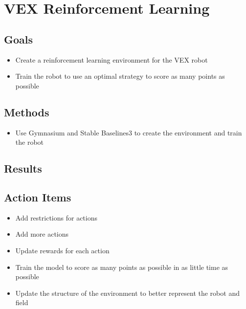 \section{VEX Reinforcement Learning}

\subsection{Goals}
\begin{itemize}
    \item Create a reinforcement learning environment for the VEX robot
    \item Train the robot to use an optimal strategy to score as many points as possible
\end{itemize}

\subsection{Methods}
\begin{itemize}
    \item Use Gymnasium and Stable Baselines3 to create the environment and train the robot
\end{itemize}

\subsection{Results}

\subsection{Action Items}
\begin{itemize}
    \item Add restrictions for actions
    \item Add more actions
    \item Update rewards for each action
    \item Train the model to score as many points as possible in as little time as possible
    \item Update the structure of the environment to better represent the robot and field
\end{itemize}